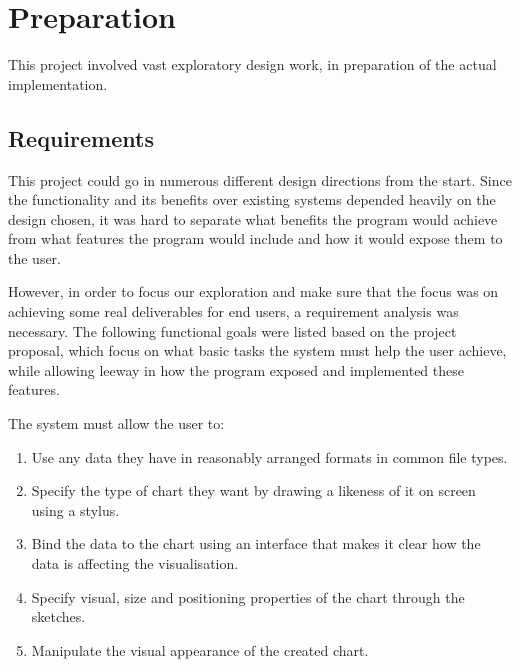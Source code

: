 \chapter{Preparation}
This project involved vast exploratory design work, in preparation of the actual implementation.

	\section{Requirements}
	\label{sec:Requirements}
	This project could go in numerous different design directions from the start. Since the functionality and its benefits over existing systems depended heavily on the design chosen, it was hard to separate what benefits the program would achieve from what features the program would include and how it would expose them to the user. 
	
	However, in order to focus our exploration and make sure that the focus was on achieving some real deliverables for end users, a requirement analysis was necessary. The following functional goals were listed based on the project proposal, which focus on what basic tasks the system must help the user achieve, while allowing leeway in how the program exposed and implemented these features.
	
	The system must allow the user to:
	\begin{enumerate}[label=\bfseries Core \arabic*:]
		\item Use any data they have in reasonably arranged formats in common file types.
		\item Specify the type of chart they want by drawing a likeness of it on screen using a stylus.
		\item Bind the data to the chart using an interface that makes it clear how the data is affecting the visualisation.
		\item Specify visual, size and positioning properties of the chart through the sketches.
		\item Manipulate the visual appearance of the created chart.
	\end{enumerate}
	
